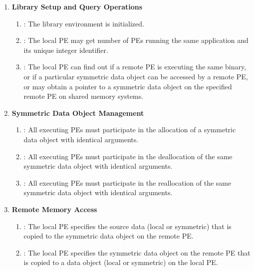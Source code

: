 \begin{enumerate}
\item \textbf{Library Setup and Query Operations}

\begin{enumerate}
\item {}: The \openshmem library environment is initialized. 
\item {}: The local \ac{PE} may get number of \acp{PE} running the same application and its unique integer identifier. 
\item {}: The local \ac{PE} can find out if a remote \ac{PE} is executing the same binary, or if a particular symmetric data object can be accessed by a remote \ac{PE}, or may obtain a pointer to a symmetric data object on the specified remote \ac{PE} on shared memory systems.
\end{enumerate}

\item \textbf{Symmetric Data Object Management}
\begin{enumerate}
\item {}: All executing \ac{PE}s must participate in the allocation of a symmetric data object with identical arguments.
\item  {}: All executing \ac{PE}s must participate in the deallocation of the same symmetric data object with identical arguments.
\item  {}: All executing \ac{PE}s must participate in the reallocation of the same symmetric data object with identical arguments.
\end{enumerate}

\item \textbf{Remote Memory Access}

\begin{enumerate}
\item {}: The local \ac{PE} specifies the source
data (local or symmetric) that is copied to the symmetric data object on the remote \ac{PE}. 
\item {}: The local \ac{PE} specifies the symmetric data object on the remote \ac{PE}
that is copied to a data object (local or symmetric) on the local \ac{PE}. 
\end{enumerate}


\end{enumerate}
